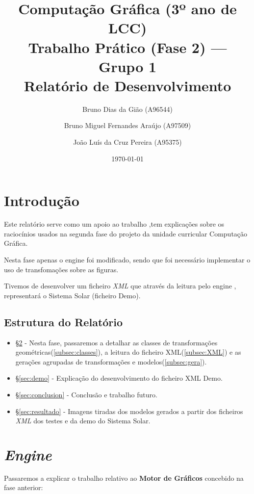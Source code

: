 \documentclass[14pt, a4paper]{article}
\title{Computação Gráfica (3º ano de LCC)\\
       \textbf{Trabalho Prático (Fase 2) — Grupo 1}\\ Relatório de Desenvolvimento}
\author{ Bruno Dias da Gião  (A96544) 
    \and Bruno Miguel Fernandes Araújo (A97509)
    \and João Luís da Cruz Pereira (A95375)}
\date{\today} %
\begin{document}
\begin{titlepage}
\maketitle
\end{titlepage}

\tableofcontents
\listoffigures
\newpage
\section{Introdução} \label{sec:intro}

Este relatório serve como um apoio ao trabalho ,tem explicações sobre os raciocínios usados na segunda fase do projeto da unidade curricular Computação Gráfica.

Nesta fase apenas o engine foi modificado, sendo que foi necessário implementar o uso de transfomações sobre as figuras.

Tivemos de desenvolver um ficheiro \textit{XML} que através da leitura pelo engine , representará o Sistema Solar (ficheiro Demo).


\subsection{Estrutura do Relatório}
\begin{itemize}

\item \S\ref{sec:engine} - Nesta fase, passaremos a detalhar as classes de transformações
geométricas(\ref{subsec:classes}), a leitura do ficheiro XML(\ref{subsec:XML}) e
as gerações agrupadas de transformações e modelos(\ref{subsec:gera}).

\item \S\ref{sec:demo} - Explicação do desenvolvimento do ficheiro XML Demo.

\item \S\ref{sec:conclusion} - Conclusão e trabalho futuro.

\item \S\ref{sec:resultado} - Imagens tiradas dos modelos gerados a partir dos ficheiros \textit{XML} dos testes e da demo do Sistema Solar.
\end{itemize}

\section{\textit{Engine}} \label{sec:engine}
Passaremos a explicar o trabalho relativo ao {\bf Motor de Gráficos} concebido na fase anterior:
\end{document}

